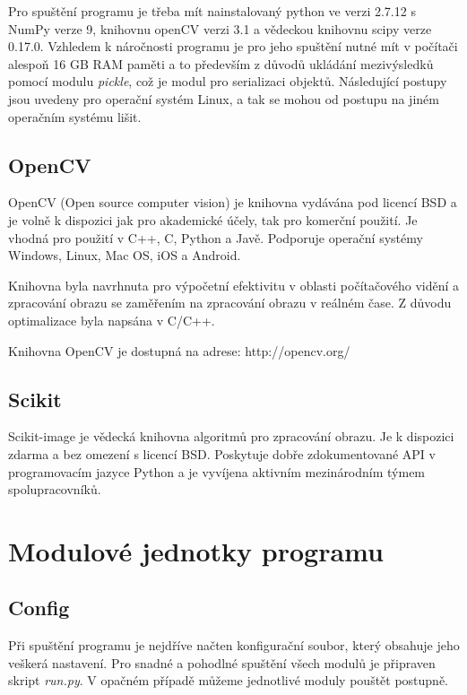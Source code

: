 \documentclass[czech,BP]{thesiskiv}
\begin{document}
\par Pro spuštění programu je třeba mít nainstalovaný python ve verzi 2.7.12 s NumPy verze 9, knihovnu openCV verzi 3.1 a vědeckou knihovnu scipy verze 0.17.0. Vzhledem k náročnosti programu je pro jeho spuštění nutné mít v počítači alespoň 16 GB RAM paměti a to především z důvodů ukládání mezivýsledků pomocí modulu \textit{pickle}, což je modul pro serializaci objektů. Následující postupy jsou uvedeny pro operační systém Linux, a tak se mohou od postupu na jiném operačním systému lišit.   
  
  
\subsection{OpenCV}
\par OpenCV (Open source computer vision) je knihovna vydávána pod licencí BSD a je volně k dispozici jak pro akademické účely, tak pro komerční použití. Je vhodná pro použití v C++, C, Python a Javě. Podporuje operační systémy Windows, Linux, Mac OS, iOS a Android.

\par Knihovna byla navrhnuta pro výpočetní efektivitu v oblasti počítačového vidění a zpracování obrazu se zaměřením na zpracování obrazu v reálném čase. Z důvodu optimalizace byla napsána v C/C++. 

\par Knihovna OpenCV je dostupná na adrese: http://opencv.org/

\subsection{Scikit}
\par Scikit-image je vědecká knihovna algoritmů pro zpracování obrazu. Je k dispozici zdarma a bez omezení s licencí BSD. Poskytuje dobře zdokumentované API v programovacím jazyce Python a je vyvíjena aktivním mezinárodním týmem spolupracovníků.
\cite{Scikit}

\section{Modulové jednotky programu}
\subsection{Config}
\par Při spuštění programu je nejdříve načten konfigurační soubor, který obsahuje jeho veškerá nastavení. Pro snadné a pohodlné spuštění všech modulů je připraven skript \textit{run.py}. V opačném případě můžeme jednotlivé moduly pouštět postupně.
\end{document}
